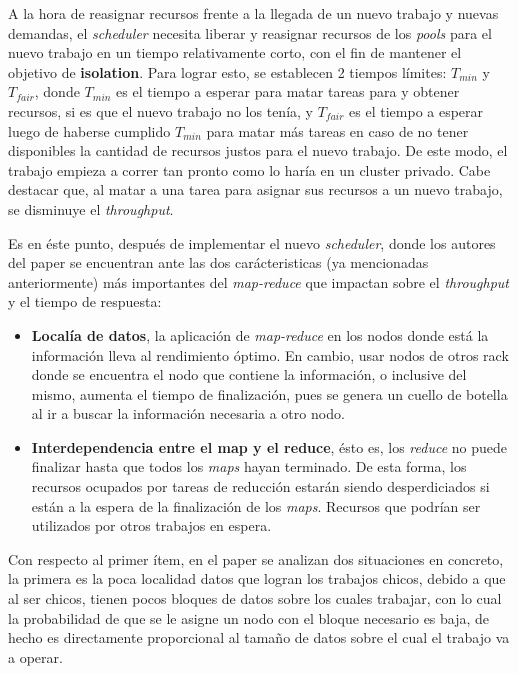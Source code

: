 \documentclass[a4paper]{article}
\begin{document}
A la hora de reasignar recursos frente a la llegada de un nuevo trabajo y
nuevas demandas, el \textit{scheduler} necesita liberar y reasignar recursos de
los \textit{pools} para el nuevo trabajo en un tiempo relativamente corto, con
el fin de mantener el objetivo de \textbf{isolation}. Para lograr esto, se
establecen 2 tiempos límites: $T_{min}$ y $T_{fair}$, donde $T_{min}$ es el
tiempo a esperar para matar tareas para y obtener recursos, si es que el nuevo
trabajo no los tenía, y $T_{fair}$ es el tiempo a esperar luego de haberse
cumplido $T_{min}$ para matar más tareas en caso de no tener disponibles la
cantidad de recursos justos para el nuevo trabajo. De este modo, el trabajo
empieza a correr tan pronto como lo haría en un cluster privado. Cabe destacar
que, al matar a una tarea para asignar sus recursos a un nuevo trabajo, se
disminuye el \textit{throughput}.

Es en éste punto, después de implementar el nuevo \textit{scheduler}, donde los
autores del paper se encuentran ante las dos carácteristicas (ya mencionadas
anteriormente) más importantes del \textit{map-reduce} que impactan sobre el
\textit{throughput} y el tiempo de respuesta:

\begin{itemize}
  \item \textbf{Localía de datos}, la aplicación de \textit{map-reduce} en los
  nodos donde está la información lleva al rendimiento óptimo. En cambio, usar
  nodos de otros rack donde se encuentra el nodo que contiene la información,
  o inclusive del mismo, aumenta el tiempo de finalización, pues se genera un
  cuello de botella al ir a buscar la información necesaria a otro nodo.
  \item \textbf{Interdependencia entre el map y el reduce}, ésto es, los
  \textit{reduce} no puede finalizar hasta que todos los \textit{maps} hayan
  terminado. De esta forma, los recursos ocupados por tareas de reducción
  estarán siendo desperdiciados si están a la espera de la finalización de los
  \textit{maps}. Recursos que podrían ser utilizados por otros trabajos en
  espera.
\end{itemize}

Con respecto al primer ítem, en el paper se analizan dos situaciones en
concreto, la primera es la poca localidad datos que logran los trabajos 
chicos, debido a que al ser chicos, tienen pocos bloques de datos sobre los
cuales trabajar, con lo cual la probabilidad de que se le asigne un nodo con el
bloque necesario es baja, de hecho es directamente proporcional al tamaño de
datos sobre el cual el trabajo va a operar.
\end{document}
